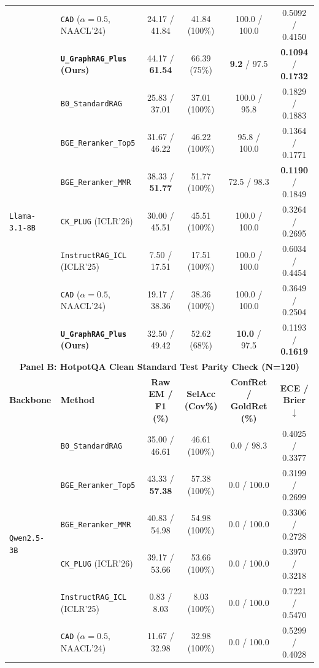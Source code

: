 \documentclass[11pt]{article}
\begin{document}
\begin{table}[t]
{{\begin{tabular}{llcccc}
& \texttt{CAD} ($\alpha=0.5$, NAACL'24) & 24.17 / 41.84 & 41.84 (100\%) & 100.0 / 100.0 & 0.5092 / 0.4150 \\
& \textbf{\texttt{U\_GraphRAG\_Plus} (Ours)} & 44.17 / \textbf{61.54} & 66.39 (75\%) & \textbf{9.2} / 97.5 & \textbf{0.1094} / \textbf{0.1732} \\
\midrule
\multirow{7}{*}{\texttt{Llama-3.1-8B}}
& \texttt{B0\_StandardRAG} & 25.83 / 37.01 & 37.01 (100\%) & 100.0 / 95.8 & 0.1829 / 0.1883 \\
& \texttt{BGE\_Reranker\_Top5} & 31.67 / 46.22 & 46.22 (100\%) & 95.8 / 100.0 & 0.1364 / 0.1771 \\
& \texttt{BGE\_Reranker\_MMR} & 38.33 / \textbf{51.77} & 51.77 (100\%) & 72.5 / 98.3 & \textbf{0.1190} / 0.1849 \\
& \texttt{CK\_PLUG} (ICLR'26) & 30.00 / 45.51 & 45.51 (100\%) & 100.0 / 100.0 & 0.3264 / 0.2695 \\
& \texttt{InstructRAG\_ICL} (ICLR'25) & 7.50 / 17.51 & 17.51 (100\%) & 100.0 / 100.0 & 0.6034 / 0.4454 \\
& \texttt{CAD} ($\alpha=0.5$, NAACL'24) & 19.17 / 38.36 & 38.36 (100\%) & 100.0 / 100.0 & 0.3649 / 0.2504 \\
& \textbf{\texttt{U\_GraphRAG\_Plus} (Ours)} & 32.50 / 49.42 & 52.62 (68\%) & \textbf{10.0} / 97.5 & 0.1193 / \textbf{0.1619} \\
\midrule
\midrule
\multicolumn{6}{c}{\textbf{Panel B: HotpotQA Clean Standard Test Parity Check (N=120)}} \\
\midrule
\textbf{Backbone} & \textbf{Method} & \textbf{Raw EM / F1 (\%)} & \textbf{SelAcc (Cov\%)} & \textbf{ConfRet / GoldRet (\%)} & \textbf{ECE / Brier $\downarrow$} \\
\midrule
\multirow{7}{*}{\texttt{Qwen2.5-3B}}
& \texttt{B0\_StandardRAG} & 35.00 / 46.61 & 46.61 (100\%) & 0.0 / 98.3 & 0.4025 / 0.3377 \\
& \texttt{BGE\_Reranker\_Top5} & 43.33 / \textbf{57.38} & 57.38 (100\%) & 0.0 / 100.0 & 0.3199 / 0.2699 \\
& \texttt{BGE\_Reranker\_MMR} & 40.83 / 54.98 & 54.98 (100\%) & 0.0 / 100.0 & 0.3306 / 0.2728 \\
& \texttt{CK\_PLUG} (ICLR'26) & 39.17 / 53.66 & 53.66 (100\%) & 0.0 / 100.0 & 0.3970 / 0.3218 \\
& \texttt{InstructRAG\_ICL} (ICLR'25) & 0.83 / 8.03 & 8.03 (100\%) & 0.0 / 100.0 & 0.7221 / 0.5470 \\
& \texttt{CAD} ($\alpha=0.5$, NAACL'24) & 11.67 / 32.98 & 32.98 (100\%) & 0.0 / 100.0 & 0.5299 / 0.4028 \\

\end{tabular}}}
\end{table}
\end{document}
